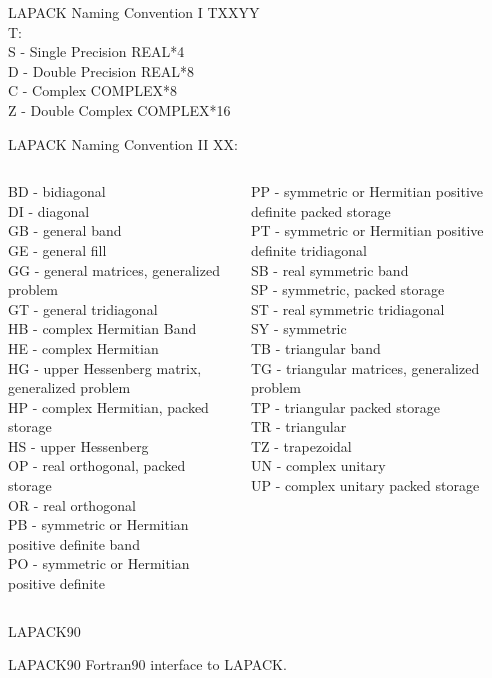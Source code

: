 	\begin{frame}{LAPACK Naming Convention I}
	TXXYY \\
	T: \\
	S - Single Precision REAL*4 \\
	D - Double Precision REAL*8 \\
	C - Complex COMPLEX*8 \\
	Z - Double Complex COMPLEX*16 
	\end{frame}
	\begin{frame}{LAPACK Naming Convention II}
	XX: 
	\vspace{5mm}
	\begin{columns}
		\begin{column}{0.5\textwidth}
		\scriptsize
	BD - bidiagonal \\
	DI - diagonal \\
	GB - general band \\
	GE - general fill \\
	GG - general matrices, generalized problem \\
	GT - general tridiagonal \\
	HB - complex Hermitian Band \\
	HE - complex Hermitian \\
	HG - upper Hessenberg matrix, generalized problem \\
	HP - complex Hermitian, packed storage \\
	HS - upper Hessenberg \\
	OP - real orthogonal, packed storage \\
	OR - real orthogonal \\
	PB - symmetric or Hermitian positive definite band \\
	PO - symmetric or Hermitian positive definite \\
	\end{column}
	\begin{column}{0.5\textwidth}
	\scriptsize
	PP - symmetric or Hermitian positive definite packed storage \\
	PT - symmetric or Hermitian positive definite tridiagonal \\
	SB - real symmetric band \\
	SP - symmetric, packed storage \\
	ST - real symmetric tridiagonal \\
	SY - symmetric \\
	TB - triangular band \\
	TG - triangular matrices, generalized problem \\
	TP - triangular packed storage \\
	TR - triangular \\
	TZ - trapezoidal \\
	UN - complex unitary \\
	UP - complex unitary packed storage \\
		\end{column}
	\end{columns}
	\end{frame}
	\begin{frame}{LAPACK90}
		\begin{block}{LAPACK90}
			Fortran90 interface to LAPACK.
		\end{block}
	\end{frame}